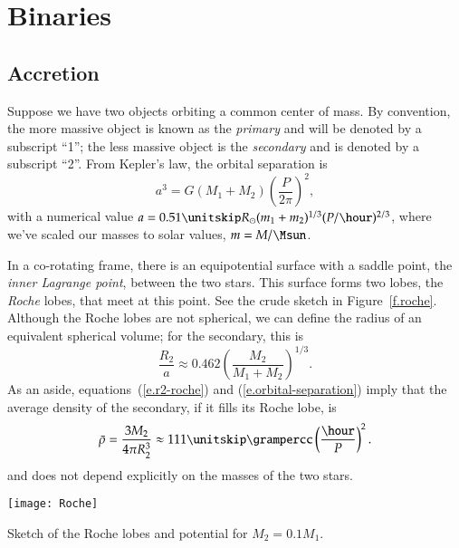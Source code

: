 \chapter{Binaries}\label{ch.binaries}

\section{Accretion}\label{s.accretion}

Suppose we have two objects orbiting a common center of mass.  By convention, the more massive object is known as the \emph{primary} and will be denoted by a subscript ``1''; the less massive object is the \emph{secondary} and is denoted by a subscript ``2''.  From Kepler's law, the orbital separation is
\begin{equation}\label{e.orbital-separation}
	a^{3} = G(M_{1}+M_{2}) \left(\frac{P}{2\pi}\right)^{2}, 
\end{equation}
with a numerical value $a = 0.51\nsp R_{\sun} (m_{1}+m_{2})^{1/3} (P/\hour)^{2/3}$, where we've scaled our masses to solar values, $m = M/\Msun$.

In a co-rotating frame, there is an equipotential surface with a saddle point, the \emph{inner Lagrange point}, between the two stars.  This surface forms two lobes, the \emph{Roche} lobes, that meet at this point. See the crude sketch in Figure~\ref{f.roche}.
Although the Roche lobes are not spherical, we can define the radius of an equivalent spherical volume; for the secondary, this is
\begin{equation}\label{e.r2-roche}
\frac{R_{2}}{a} \approx 0.462 \left(\frac{M_{2}}{M_{1} + M_{2}}\right)^{1/3}.
\end{equation}
As an aside, equations~(\ref{e.r2-roche}) and (\ref{e.orbital-separation}) imply that the average density of the secondary, if it fills its Roche lobe, is
\[
	\bar{\rho} = \frac{3M_{2}}{4\pi R_{2}^{3}} \approx 111\nsp\grampercc\left(\frac{\hour}{P}\right)^{2}.
\]
and does not depend explicitly on the masses of the two stars.

\begin{marginfigure}[-5\baselineskip]
\texttt{[image: Roche]}
\caption[Schematic of Roche lobes]{\label{f.roche} Sketch of the Roche lobes and potential for $M_{2} = 0.1 M_{1}$.}
\end{marginfigure}

